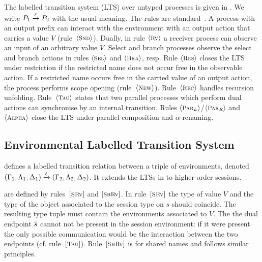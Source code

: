 The labelled transition system (LTS) over untyped processes
is given in
. 
We write $P_1 \xrightarrow{\ell} P_2$ with the usual meaning.
The rules are standard~\cite{KYHH2015,KY2015}.
A process with an output prefix can
interact with the environment with an output action that carries a value
$V$ (rule~$\ltsrule{Snd}$).  Dually, in rule $\ltsrule{Rv}$ a
receiver process can observe an input of an arbitrary value $V$.
Select and branch processes observe the select and branch
actions in rules $\ltsrule{Sel}$ and $\ltsrule{Bra}$, resp.
Rule $\ltsrule{Res}$ closes the LTS under restriction 
if the restricted name does not occur free in the
observable action. 
If a restricted name occurs free in
the carried value of an output action,
the process performs scope opening (rule~$\ltsrule{New}$).  
Rule~$\ltsrule{Rec}$ handles recursion unfolding.
Rule~$\ltsrule{Tau}$ 
states that two parallel processes which perform
dual actions can synchronise by an internal transition.
Rules $\ltsrule{Par${}_L$}$/$\ltsrule{Par${}_R$}$ 
and $\ltsrule{Alpha}$ close the LTS
under parallel composition and $\alpha$-renaming. 

\subsection{Environmental Labelled Transition System}
\label{ss:elts}
\noi 
{}
defines a labelled transition relation between 
a triple of environments, 
denoted
$(\Gamma_1, \Lambda_1, \Delta_1) \xrightarrow{\ell} (\Gamma_2, \Lambda_2, \Delta_2)$.
It extends the LTSs
in \cite{KYHH2015,KY2015} 
to higher-order sessions. 

are defined by 
rules~$\eltsrule{SRv}$ and $\eltsrule{ShRv}$.
In rule~$\eltsrule{SRv}$
the type of value $V$
and the type of the object associated to the session type on $s$ 
should coincide. 
The resulting type tuple must contain the environments 
associated to $V$. 
The %
the dual endpoint $\overline{s}$ cannot not be
present in the session environment: if it were present
the only possible communication would be the interaction
between the two endpoints (cf. rule~$\eltsrule{Tau}$).
Rule~$\eltsrule{ShRv}$ is for shared names and follows similar principles.

